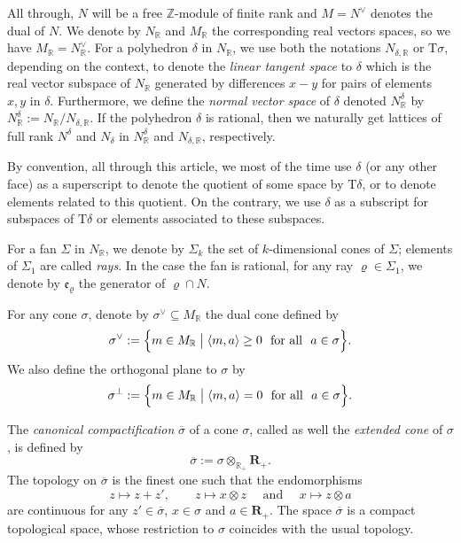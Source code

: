 \documentclass[11pt]{amsart}
\theoremstyle{definition}
\numberwithin{equation}{section}
\renewcommand{\~}{\widetilde}
\newcommand{\Z}{\mathbb{Z}}
\newcommand{\R}{\mathbb{R}}
\newcommand{\myand}{\text{ and }}
\newcommand{\rquot}[2]{#1\big/#2}
\newcommand{\eR}{\mathbf R} %
\newcommand{\e}{{\mathfrak e}} %
\newcommand{\TT}{\mathrm{T}} %
\newcommand{\st}{\bigm|} %
\newcommand{\comp}[1]{\overline{#1}} %
\begin{document}
\medskip

All through, $N$ will be a free $\Z$-module of finite rank and $M=N^{\vee}$ denotes the dual of $N$. We denote by $N_\R$ and $M_\R$ the corresponding real vectors spaces, so we have $M_\R =N_\R^\vee$. For a polyhedron $\delta$ in $N_\R$, we use both the notations $N_{\delta, \R}$ or $\TT\sigma$, depending on the context, to denote the \emph{linear tangent space} to $\delta$ which is the real vector subspace of $N_\R$ generated by differences $x-y$ for pairs of elements $x, y$ in $\delta$. Furthermore, we define the \emph{normal vector space} of $\delta$ denoted $N^{\delta}_{\R}$ by $N^{\delta}_{\R} := \rquot{N_\R}{N_{\delta, \R}}$. If the polyhedron $\delta$ is rational, then we naturally get lattices of full rank $N^\delta$ and $N_\delta$ in $N^\delta_\R$ and $N_{\delta, \R}$, respectively.

\medskip

By convention, all through this article, we most of the time use $\delta$ (or any other face) as a superscript to denote the quotient of some space by $\TT\delta$, or to denote elements related to this quotient. On the contrary, we use $\delta$ as a subscript for subspaces of $\TT\delta$ or elements associated to these subspaces.

\medskip

For a fan $\Sigma$ in $N_\mathbb R$, we denote by $\Sigma_k$ the set of $k$-dimensional cones of $\Sigma$; elements of $\Sigma_1$ are called \emph{rays}. In the case the fan is rational, for any ray $\varrho\in\Sigma_1$, we denote by $\e_\varrho$ the generator of $\varrho\cap N$.

\medskip

For any cone $\sigma$, denote by $\sigma^\vee \subseteq M_\R$ the dual cone defined by
\[\sigma^\vee := \Bigl\{m \in M_\mathbb R \st \langle m, a \rangle \geq 0 \ \textrm{ for all }\ a \in \sigma\Bigr\}. \]
We also define the orthogonal plane to $\sigma$ by
\[\sigma^\perp := \Bigl\{m \in M_\mathbb R \st \langle m, a \rangle = 0 \ \textrm{ for all }\ a \in \sigma\Bigr\}.  \]

\medskip

The \emph{canonical compactification} $\comp \sigma$ of a cone $\sigma$, called as well the \emph{extended cone} of $\sigma$, is defined by
\[\comp \sigma := \sigma \otimes_{\R_+} \eR_+. \]
The topology on $\comp\sigma$ is the finest one such that the endomorphisms
\[ z\mapsto z+z', \qquad z\mapsto x\otimes z \quad\myand\quad x\mapsto z\otimes a \]
are continuous for any $z'\in\comp\sigma$, $x\in\sigma$ and $a\in\eR_+$.
The space $\comp\sigma$ is a compact topological space, whose restriction to $\sigma$ coincides with the usual topology.
\end{document}
